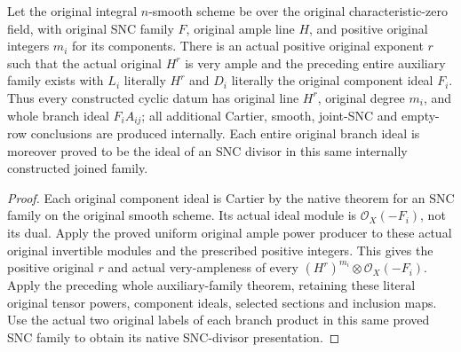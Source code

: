 \begin{theorem}
\label{thm:kn-nadel-ample-original-component-branch-family}
\leanok
{}
Let the original integral $n$-smooth scheme be over the original
characteristic-zero field, with original SNC family $F$, original ample line
$H$, and positive original integers $m_i$ for its components. There is an
actual positive original exponent $r$ such that the actual original $H^r$
is very ample and the preceding entire auxiliary family exists with
$L_i$ literally $H^r$ and $D_i$ literally the original component ideal
$F_i$. Thus every constructed cyclic datum has original line $H^r$,
original degree $m_i$, and whole branch ideal $F_i A_{ij}$; all additional
Cartier, smooth, joint-SNC and empty-row conclusions are produced internally.
Each entire original branch ideal is moreover proved to be the ideal of
an SNC divisor in this same internally constructed joined family.
\end{theorem}
\begin{proof}
Each original component ideal is Cartier by the native theorem for an SNC
family on the original smooth scheme. Its actual ideal module is
$\mathcal O_X(-F_i)$, not its dual. Apply the proved uniform original ample
power producer to these actual original invertible modules and the prescribed
positive integers. This gives the positive original $r$ and actual
very-ampleness of every $(H^r)^{m_i}\otimes\mathcal O_X(-F_i)$.
Apply the preceding whole auxiliary-family theorem, retaining these literal
original tensor powers, component ideals, selected sections and inclusion maps.
Use the actual two original labels of each branch product in this same
proved SNC family to obtain its native SNC-divisor presentation.
\end{proof}
